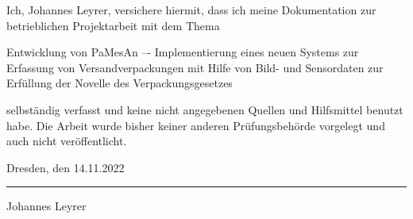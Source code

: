 \newpage
{}


Ich, Johannes Leyrer, versichere hiermit, dass ich meine Dokumentation zur betrieblichen Projektarbeit mit dem Thema

\vspace{0.3cm}

\begin{addmargin}[1cm]{2cm}%
    Entwicklung von PaMesAn –- Implementierung eines neuen Systems zur Erfassung von Versandverpackungen mit Hilfe von Bild- und Sensordaten zur Erfüllung der Novelle des Verpackungsgesetzes
\end{addmargin}

\vspace{0.3cm}
selbständig verfasst und keine nicht angegebenen Quellen und Hilfsmittel benutzt habe. Die Arbeit wurde bisher keiner anderen Prüfungsbehörde vorgelegt und auch nicht veröffentlicht.

\vspace{0.9cm}
Dresden, den 14.11.2022

\vspace{0.6cm}
\rule{6cm}{0.4pt}

Johannes Leyrer